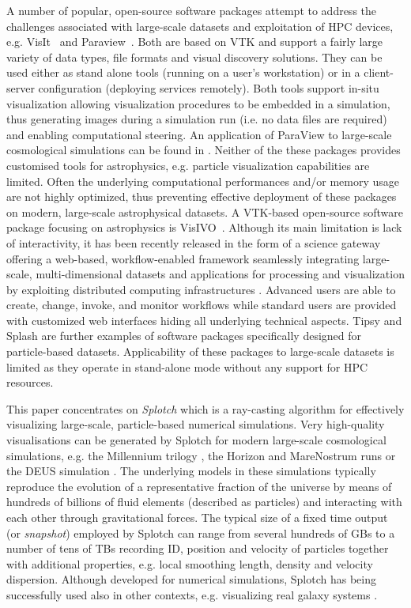 \documentclass[1p]{elsarticle}
\begin{document}
A number of popular, open-source software packages attempt to address the challenges associated with large-scale datasets and exploitation of HPC devices, e.g. VisIt~\cite{visit} and Paraview~\cite{paraview}. Both are based on VTK \cite{vtk} and support a fairly large variety of data types, file formats and visual discovery solutions. They can be used either as stand alone tools (running on a user's workstation) or in a client-server configuration (deploying services remotely). Both tools support in-situ visualization allowing visualization procedures to be embedded in a simulation, thus generating images during a simulation run (i.e. no data files are required) and enabling computational steering. An application of ParaView to large-scale cosmological simulations can be found in \cite{2011ApJS..195...11W}. Neither of the these packages provides customised tools for astrophysics,  e.g. particle visualization capabilities are limited. Often the underlying computational performances and/or memory usage are not highly optimized, thus preventing effective deployment of these packages on modern, large-scale astrophysical datasets. A VTK-based open-source software package focusing on astrophysics is VisIVO~\cite{visivo}. Although its main limitation is lack of interactivity, it has been recently released in the form of a science gateway offering a web-based, workflow-enabled framework seamlessly integrating large-scale, multi-dimensional datasets and applications for processing and visualization by exploiting distributed computing infrastructures \cite{}. Advanced users are able to create, change, invoke, and monitor workflows while standard users are provided with customized web interfaces hiding all underlying technical aspects. Tipsy \cite{tipsyurl} and Splash \cite{splash} are further examples of software packages specifically designed for particle-based datasets. Applicability of these packages to large-scale datasets is limited as they operate in stand-alone mode without any support for HPC resources.

This paper concentrates on {\it Splotch} \cite{2008NJPh...10l5006D} which is a ray-casting algorithm for effectively visualizing large-scale, particle-based numerical simulations. Very high-quality visualisations can be generated by Splotch for modern large-scale cosmological simulations, e.g. the Millennium trilogy \cite{millennium}, the Horizon and MareNostrum runs \cite{horizon} or the DEUS simulation \cite{deus}. The underlying models in these simulations typically reproduce the evolution of a representative fraction of the universe by means of hundreds of billions of fluid elements (described as particles) and interacting with each other through gravitational forces. The typical size of a fixed time output (or {\it snapshot}) employed by Splotch can range from several hundreds of GBs to a number of tens of TBs recording ID, position and velocity of particles together with additional properties, e.g. local smoothing length, density and velocity dispersion. Although developed for numerical simulations, Splotch has being successfully used 
also in other contexts, e.g. visualizing real galaxy systems \cite{}.
\end{document}
